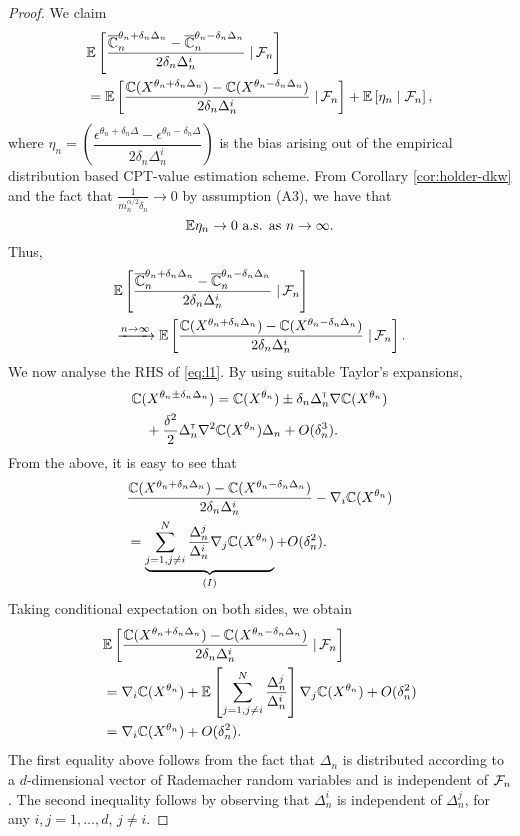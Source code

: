 \begin{proof}
We claim
\begin{align}
&\mathbb{E}\left[\dfrac{\overline {\mathbb{C}}_n^{\theta_n+\delta_n \Delta_n} -\overline {\mathbb{C}}_n^{\theta_n-\delta_n \Delta_n}}{2 \delta_n \Delta_n^{i}} \left.\right| \mathcal{F}_n\right] \\
&= \mathbb{E}\left[\dfrac{\mathbb{C}(X^{\theta_n + \delta_n \Delta_n}) - \mathbb{C}(X^{\theta_n - \delta_n \Delta_n})}{2 \delta_n \Delta_n^{i}} \left.\right| \mathcal{F}_n\right] + \mathbb{E}\left[ \eta_n \mid \mathcal{F}_n\right],
\end{align}
where $\eta_n = \left(\dfrac{\epsilon^{\theta_n +\delta_n\Delta} - \epsilon^{\theta_n-\delta_n\Delta}}{2\delta_n\Delta_n^{i}}\right)$
 is the bias arising out of the empirical distribution based CPT-value estimation scheme.
From Corollary \ref{cor:holder-dkw} and the fact that $\frac{1}{m_n^{\alpha/2} \delta_n} \rightarrow 0$ by assumption (A3), we have that
$$\mathbb{E} \eta_n \rightarrow 0 \text{ a.s. as } n \rightarrow \infty.$$ 
Thus,
\begin{align}
&\mathbb{E}\left[\dfrac{\overline {\mathbb{C}}_n^{\theta_n+\delta_n \Delta_n} -\overline {\mathbb{C}}_n^{\theta_n-\delta_n \Delta_n}}{2 \delta_n \Delta_n^{i}} \left.\right| \mathcal{F}_n\right] \nonumber\\
&\xrightarrow{n\rightarrow\infty}  \mathbb{E}\left[\dfrac{\mathbb{C}(X^{\theta_n + \delta_n \Delta_n}) -\mathbb{C}(X^{\theta_n - \delta_n \Delta_n})}{2 \delta_n \Delta_n^{i}} \left.\right| \mathcal{F}_n\right].  \label{eq:l1}
\end{align}
We now analyse the RHS of \eqref{eq:l1}.
By using suitable Taylor's expansions,
\begin{align*}
&\mathbb{C}(X^{\theta_n \pm \delta_n \Delta_n}) = \mathbb{C}(X^{\theta_n}) \pm \delta_n \Delta_n^\mathsf{\scriptscriptstyle T} \nabla \mathbb{C}(X^{\theta_n}) \\
&\quad+ \frac{\delta^2}{2} \Delta_n^\mathsf{\scriptscriptstyle T} \nabla^2 \mathbb{C}(X^{\theta_n})\Delta_n + O(\delta_n^3).
\end{align*}
From the above, it is easy to see that 
\begin{align*}
&\dfrac{\mathbb{C}(X^{\theta_n + \delta_n \Delta_n}) - \mathbb{C}(X^{\theta_n - \delta_n \Delta_n})}{2 \delta_n \Delta_n^i}
- \nabla_i \mathbb{C}(X^{\theta_n})\\
&=\underbrace{\sum_{j=1,j\not=i}^{N} \frac{\Delta_n^j}{\Delta_n^i}\nabla_j \mathbb{C}(X^{\theta_n})}_{(I)} + O(\delta_n^2).
\end{align*}
Taking conditional expectation on both sides, we obtain
\begin{align}
&\mathbb{E}\left[\dfrac{\mathbb{C}(X^{\theta_n + \delta_n \Delta_n}) - \mathbb{C}(X^{\theta_n - \delta_n \Delta_n})}{2 \delta_n \Delta_n^i} \left.\right| \mathcal{F}_n\right] \nonumber\\
&= \nabla_i \mathbb{C}(X^{\theta_n}) + \mathbb{E}\left[\sum_{j=1,j\not=i}^{N} \frac{\Delta_n^j}{\Delta_n^i}\right]\nabla_j \mathbb{C}(X^{\theta_n}) + O(\delta_n^2)\nonumber\\
&=  \nabla_i \mathbb{C}(X^{\theta_n}) + O(\delta_n^2).\label{eq:l2}
\end{align}
The first equality above follows from the fact that $\Delta_n$ is distributed according to a $d$-dimensional vector of Rademacher random variables and is independent of $\mathcal{F}_n$. The second inequality follows by observing that $\Delta_n^i$ is independent of $\Delta_n^j$, for any $i,j =1,\ldots,d$, $j\ne i$. 


\end{proof}
